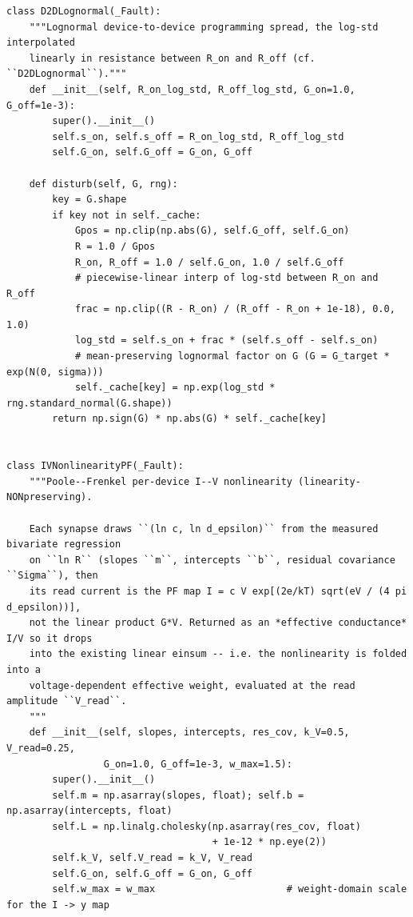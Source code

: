 \begin{lstlisting}[caption={mrl\_trace/device\_faults.py},label={lst:siox-src-device_faults}]
class D2DLognormal(_Fault):
    """Lognormal device-to-device programming spread, the log-std interpolated
    linearly in resistance between R_on and R_off (cf. ``D2DLognormal``)."""
    def __init__(self, R_on_log_std, R_off_log_std, G_on=1.0, G_off=1e-3):
        super().__init__()
        self.s_on, self.s_off = R_on_log_std, R_off_log_std
        self.G_on, self.G_off = G_on, G_off

    def disturb(self, G, rng):
        key = G.shape
        if key not in self._cache:
            Gpos = np.clip(np.abs(G), self.G_off, self.G_on)
            R = 1.0 / Gpos
            R_on, R_off = 1.0 / self.G_on, 1.0 / self.G_off
            # piecewise-linear interp of log-std between R_on and R_off
            frac = np.clip((R - R_on) / (R_off - R_on + 1e-18), 0.0, 1.0)
            log_std = self.s_on + frac * (self.s_off - self.s_on)
            # mean-preserving lognormal factor on G (G = G_target * exp(N(0, sigma)))
            self._cache[key] = np.exp(log_std * rng.standard_normal(G.shape))
        return np.sign(G) * np.abs(G) * self._cache[key]


class IVNonlinearityPF(_Fault):
    """Poole--Frenkel per-device I--V nonlinearity (linearity-NONpreserving).

    Each synapse draws ``(ln c, ln d_epsilon)`` from the measured bivariate regression
    on ``ln R`` (slopes ``m``, intercepts ``b``, residual covariance ``Sigma``), then
    its read current is the PF map I = c V exp[(2e/kT) sqrt(eV / (4 pi d_epsilon))],
    not the linear product G*V. Returned as an *effective conductance* I/V so it drops
    into the existing linear einsum -- i.e. the nonlinearity is folded into a
    voltage-dependent effective weight, evaluated at the read amplitude ``V_read``.
    """
    def __init__(self, slopes, intercepts, res_cov, k_V=0.5, V_read=0.25,
                 G_on=1.0, G_off=1e-3, w_max=1.5):
        super().__init__()
        self.m = np.asarray(slopes, float); self.b = np.asarray(intercepts, float)
        self.L = np.linalg.cholesky(np.asarray(res_cov, float)
                                    + 1e-12 * np.eye(2))
        self.k_V, self.V_read = k_V, V_read
        self.G_on, self.G_off = G_on, G_off
        self.w_max = w_max                       # weight-domain scale for the I -> y map


\end{lstlisting}
